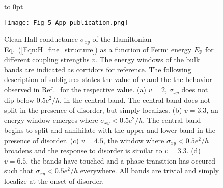 \documentclass[aps,prb,amsmath,amssymb,twocolumn, superscriptaddress]{revtex4-2}
\newcommand{\eq}[1]{Eq.~(\ref{#1})}
\begin{document}
\begin{figure}[htp]	 
{
    \vbox to 0pt {
            \raggedright
            \textcolor{white}{
            }
        }
}
{\texttt{[image: Fig\_5\_App\_publication.png]}}
\caption{Clean Hall conductance $\sigma_{xy}$ of the Hamiltonian \eq{Eqn:H_fine_structure} as a function of Fermi energy $E_\mathrm{F}$ for different coupling strengths $v$. The energy windows of the bulk bands are indicated as corridors for reference. The following description of subfigures states the value of $v$ and the the behavior observed in Ref.~\cite{Fine_structure_App} for the respective value. (a) $v = 2$, $\sigma_{xy}$ does not dip below  $0.5 e^2 / h$, in the central band. The central band does not split in the presence of disorder, but simply localizes. (b) $v = 3.3$, an energy window emerges where $\sigma_{xy} < 0.5 e^2 / h$. The central band begins to split and annihilate with the upper and lower band in the presence of disorder. (c) $v = 4.5$, the window where $\sigma_{xy} < 0.5 e^2 / h$ broadens and the response to disorder is similar to $v = 3.3$. (d) $v = 6.5$, the bands have touched and a phase transition has occured such that $\sigma_{xy} < 0.5 e^2 / h$ everywhere. All bands are trivial and simply localize at the onset of disorder.
 }\label{Fig:Fine_structure}
\end{figure}

\twocolumngrid
\end{document}
